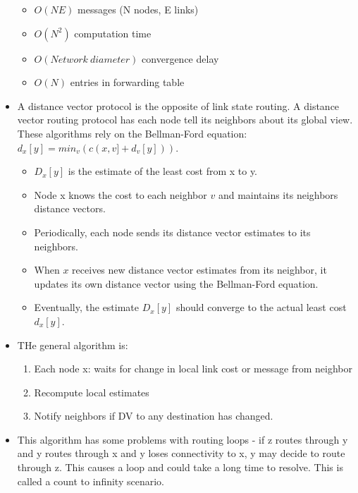 \begin{itemize}
  \begin{itemize}
  \tightlist
  \item
    \(O(NE)\) messages (N nodes, E links)
  \item
    \(O(N^2)\) computation time
  \item
    \(O(Network \ diameter)\) convergence delay
  \item
    \(O(N)\) entries in forwarding table
  \end{itemize}
\item
  A distance vector protocol is the opposite of link state routing. A
  distance vector routing protocol has each node tell its neighbors
  about its global view. These algorithms rely on the Bellman-Ford
  equation: \(d_x[y] = min_v(c(x, v] + d_v[y]))\).

  \begin{itemize}
  \tightlist
  \item
    \(D_x[y]\) is the estimate of the least cost from x to y.
  \item
    Node x knows the cost to each neighbor \(v\) and maintains its
    neighbors distance vectors.
  \item
    Periodically, each node sends its distance vector estimates to its
    neighbors.
  \item
    When \(x\) receives new distance vector estimates from its neighbor,
    it updates its own distance vector using the Bellman-Ford equation.
  \item
    Eventually, the estimate \(D_x[y]\) should converge to the actual
    least cost \(d_x[y]\).
  \end{itemize}
\item
  THe general algorithm is:

  \begin{enumerate}
  \def\labelenumi{\arabic{enumi}.}
  \tightlist
  \item
    Each node x: waits for change in local link cost or message from
    neighbor
  \item
    Recompute local estimates
  \item
    Notify neighbors if DV to any destination has changed.
  \end{enumerate}
\item
  This algorithm has some problems with routing loops - if z routes
  through y and y routes through x and y loses connectivity to x, y may
  decide to route through z. This causes a loop and could take a long
  time to resolve. This is called a count to infinity scenario.


\end{itemize}
